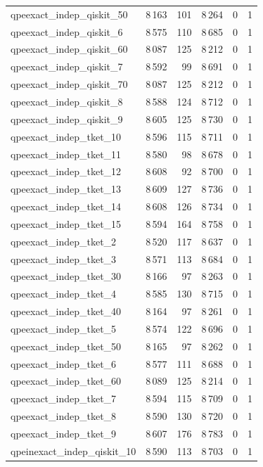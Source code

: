 \begin{longtable}{lrrrrr}
qpeexact\_indep\_qiskit\_50 & 8\,163 & 101 & 8\,264 & 0 & 1 \\
qpeexact\_indep\_qiskit\_6 & 8\,575 & 110 & 8\,685 & 0 & 1 \\
qpeexact\_indep\_qiskit\_60 & 8\,087 & 125 & 8\,212 & 0 & 1 \\
qpeexact\_indep\_qiskit\_7 & 8\,592 & 99 & 8\,691 & 0 & 1 \\
qpeexact\_indep\_qiskit\_70 & 8\,087 & 125 & 8\,212 & 0 & 1 \\
qpeexact\_indep\_qiskit\_8 & 8\,588 & 124 & 8\,712 & 0 & 1 \\
qpeexact\_indep\_qiskit\_9 & 8\,605 & 125 & 8\,730 & 0 & 1 \\
qpeexact\_indep\_tket\_10 & 8\,596 & 115 & 8\,711 & 0 & 1 \\
qpeexact\_indep\_tket\_11 & 8\,580 & 98 & 8\,678 & 0 & 1 \\
qpeexact\_indep\_tket\_12 & 8\,608 & 92 & 8\,700 & 0 & 1 \\
qpeexact\_indep\_tket\_13 & 8\,609 & 127 & 8\,736 & 0 & 1 \\
qpeexact\_indep\_tket\_14 & 8\,608 & 126 & 8\,734 & 0 & 1 \\
qpeexact\_indep\_tket\_15 & 8\,594 & 164 & 8\,758 & 0 & 1 \\
qpeexact\_indep\_tket\_2 & 8\,520 & 117 & 8\,637 & 0 & 1 \\
qpeexact\_indep\_tket\_3 & 8\,571 & 113 & 8\,684 & 0 & 1 \\
qpeexact\_indep\_tket\_30 & 8\,166 & 97 & 8\,263 & 0 & 1 \\
qpeexact\_indep\_tket\_4 & 8\,585 & 130 & 8\,715 & 0 & 1 \\
qpeexact\_indep\_tket\_40 & 8\,164 & 97 & 8\,261 & 0 & 1 \\
qpeexact\_indep\_tket\_5 & 8\,574 & 122 & 8\,696 & 0 & 1 \\
qpeexact\_indep\_tket\_50 & 8\,165 & 97 & 8\,262 & 0 & 1 \\
qpeexact\_indep\_tket\_6 & 8\,577 & 111 & 8\,688 & 0 & 1 \\
qpeexact\_indep\_tket\_60 & 8\,089 & 125 & 8\,214 & 0 & 1 \\
qpeexact\_indep\_tket\_7 & 8\,594 & 115 & 8\,709 & 0 & 1 \\
qpeexact\_indep\_tket\_8 & 8\,590 & 130 & 8\,720 & 0 & 1 \\
qpeexact\_indep\_tket\_9 & 8\,607 & 176 & 8\,783 & 0 & 1 \\
qpeinexact\_indep\_qiskit\_10 & 8\,590 & 113 & 8\,703 & 0 & 1 \\

\end{longtable}
